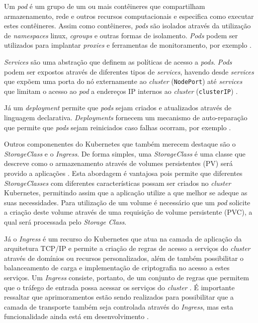 Um \textit{pod} é um grupo de um ou mais contêineres que compartilham armazenamento, rede e outros recursos computacionais e especifica como executar estes contêineres. Assim como contêineres, \textit{pods} são isolados através da utilização de \textit{namespaces} linux, \textit{cgroups} e outras formas de isolamento. \textit{Pods} podem ser utilizados para implantar \textit{proxies} e ferramentas de monitoramento, por exemplo \cite{kubernetesPods}.

\textit{Services} são uma abstração que definem as políticas de acesso a \textit{pods}. \textit{Pods} podem ser expostos através de diferentes tipos de \textit{services}, havendo desde \textit{services} que expõem uma porta do nó externamente ao \textit{cluster} (\texttt{NodePort}) até \textit{services} que limitam o acesso ao \textit{pod} a endereços \ac{IP} internos ao \textit{cluster} (\texttt{clusterIP}) \cite{kubernetesServices}.

Já um \textit{deployment} permite que \textit{pods} sejam criados e atualizados através de linguagem declarativa. \textit{Deployments} fornecem um mecanismo de auto-reparação que permite que \textit{pods} sejam reiniciados caso falhas ocorram, por exemplo \cite{kubernetesDeployments}.

Outros componenentes do Kubernetes que também merecem destaque são o \textit{StorageClass} e o \textit{Ingress}. De forma simples, uma \textit{StorageClass} é uma classe que descreve como o armazenamento através de volumes persistentes (\ac{PV}) será provido a aplicações \cite{kubernetesStorageClass}. Esta abordagem é vantajosa pois permite que diferentes \textit{StorageClasses} com diferentes características possam ser criados no \textit{cluster} Kubernetes, permitindo assim que a aplicação utilize a que melhor se adeque as suas necessidades. Para utilização de um volume é necessário que um \textit{pod} solicite a criação deste volume através de uma requisição de volume persistente (\ac{PVC}), a qual será processada pelo \textit{Storage Class}.

Já o \textit{Ingress} é um recurso do Kubernetes que atua na camada de aplicação da arquitetura \ac{TCP}/\ac{IP} e permite a criação de regras de acesso a serviços do \textit{cluster} através de domínios ou recursos personalizados, além de também possibilitar o balanceamento de carga e implementação de criptografia no acesso a estes serviços. Um \textit{Ingress} consiste, portanto, de um conjunto de regras que permitem que o tráfego de entrada possa acessar os serviços do \textit{cluster} \cite{kubernetesIngress}. É importante ressaltar que aprimoramentos estão sendo realizados para possibilitar que a camada de transporte também seja controlada através do \textit{Ingress}, mas esta funcionalidade ainda está em desenvolvimento \cite{ingressTCPUDP}.

